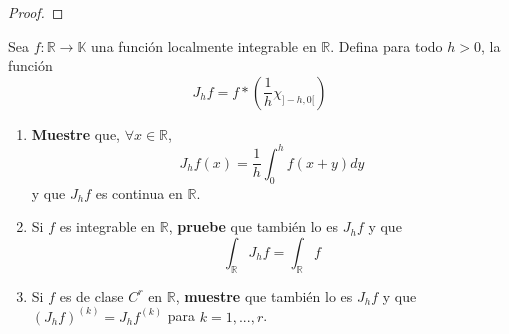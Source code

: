 \documentclass[12pt]{report}
\theoremstyle{largebreak}
\newcommand\cf[3]{\ensuremath{#1:#2\rightarrow#3}}
\begin{document}
    \begin{proof}
        
    \end{proof}

    \begin{excer}
        Sea $\cf{f}{\mathbb{R}}{\mathbb{K}}$ una función localmente integrable en $\mathbb{R}$. Defina para todo $h>0$, la función
        \begin{equation*}
            J_hf=f*\left(\frac{1}{h}\chi_{]-h,0[}\right)
        \end{equation*}
        \begin{enumerate}
            \item \textbf{Muestre} que, $\forall x\in\mathbb{R}$,
            \begin{equation*}
                J_hf(x)=\frac{1}{h}\int_0^hf(x+y)dy
            \end{equation*}
            y que $J_hf$ es continua en $\mathbb{R}$.
            \item Si $f$ es integrable en $\mathbb{R}$, \textbf{pruebe} que también lo es $J_hf$ y que
            \begin{equation*}
                \int_\mathbb{R}J_hf=\int_{\mathbb{R}}f
            \end{equation*}
            \item Si $f$ es de clase $C^r$ en $\mathbb{R}$, \textbf{muestre} que también lo es $J_hf$ y que $\left(J_hf\right)^{(k)}=J_hf^{(k)}$ para $k=1,...,r$.
        \end{enumerate}
    \end{excer}

    \begin{sol}
        
    \end{sol}
\end{document}
